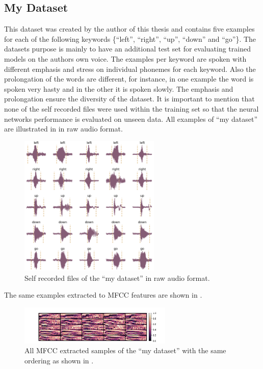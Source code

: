 \FloatBarrier
\noindent



\subsection{My Dataset}\label{sec:exp_dataset_my}
This dataset was created by the author of this thesis and contains five examples for each of the following keywords \{\enquote{left}, \enquote{right}, \enquote{up}, \enquote{down} and \enquote{go}\}.
The datasets purpose is mainly to have an additional test set for evaluating trained models on the authors own voice.
The examples per keyword are spoken with different emphasis and stress on individual phonemes for each keyword.
Also the prolongation of the words are different, for instance, in one example the word is spoken very hasty and in the other it is spoken slowly.
The emphasis and prolongation ensure the diversity of the dataset.
It is important to mention that none of the self recorded files were used within the training set so that the neural networks performance is evaluated on unseen data.
All examples of \enquote{my dataset} are illustrated in  in raw audio format.
\begin{figure}[!ht]
  \centering
    \includegraphics[width=0.6\textwidth]{./5_exp/figs/exp_dataset_my_wav_grid.png}
  \caption{Self recorded files of the \enquote{my dataset} in raw audio format.}
  \label{fig:exp_dataset_my_wav_grid}
\end{figure}
\FloatBarrier
\noindent
The same examples extracted to MFCC features are shown in .
\begin{figure}[!ht]
  \centering
    \includegraphics[width=0.65\textwidth]{./5_exp/figs/exp_dataset_my_mfcc.png}
  \caption{All MFCC extracted samples of the \enquote{my dataset} with the same ordering as shown in .}
  \label{fig:exp_dataset_my_mfcc}
\end{figure}
